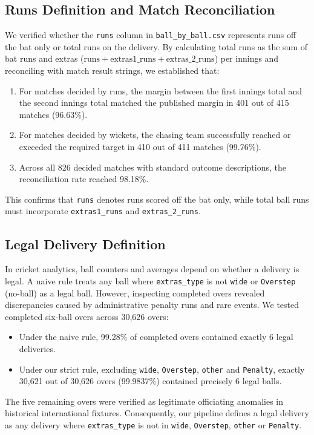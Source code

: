 \documentclass[11pt,a4paper]{article}
\begin{document}
\subsection{Runs Definition and Match Reconciliation}
We verified whether the \texttt{runs} column in \texttt{ball\_by\_ball.csv} represents runs off the bat only or total runs on the delivery. By calculating total runs as the sum of bat runs and extras ($\text{runs} + \text{extras1\_runs} + \text{extras\_2\_runs}$) per innings and reconciling with match result strings, we established that:
\begin{enumerate}
    \item For matches decided by runs, the margin between the first innings total and the second innings total matched the published margin in 401 out of 415 matches (96.63\%).
    \item For matches decided by wickets, the chasing team successfully reached or exceeded the required target in 410 out of 411 matches (99.76\%).
    \item Across all 826 decided matches with standard outcome descriptions, the reconciliation rate reached 98.18\%.
\end{enumerate}
This confirms that \texttt{runs} denotes runs scored off the bat only, while total ball runs must incorporate \texttt{extras1\_runs} and \texttt{extras\_2\_runs}.

\subsection{Legal Delivery Definition}
In cricket analytics, ball counters and averages depend on whether a delivery is legal. A naive rule treats any ball where \texttt{extras\_type} is not \texttt{wide} or \texttt{Overstep} (no-ball) as a legal ball. However, inspecting completed overs revealed discrepancies caused by administrative penalty runs and rare events. We tested completed six-ball overs across 30,626 overs:
\begin{itemize}
    \item Under the naive rule, 99.28\% of completed overs contained exactly 6 legal deliveries.
    \item Under our strict rule, excluding \texttt{wide}, \texttt{Overstep}, \texttt{other} and \texttt{Penalty}, exactly 30,621 out of 30,626 overs (99.9837\%) contained precisely 6 legal balls.
\end{itemize}
The five remaining overs were verified as legitimate officiating anomalies in historical international fixtures. Consequently, our pipeline defines a legal delivery as any delivery where \texttt{extras\_type} is not in \texttt{wide}, \texttt{Overstep}, \texttt{other} or \texttt{Penalty}.
\end{document}

